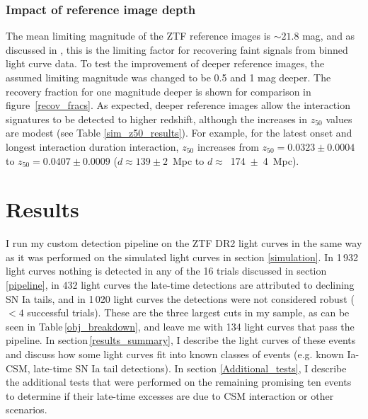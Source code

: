 \documentclass[a4paper,oneside,12pt, class=Latex/Classes/PhDthesisPSnPDF, crop=false]{standalone}
\begin{document}
\subsubsection{Impact of reference image depth}
\label{impact_refdepth}
The mean limiting magnitude of the ZTF reference images is $\sim 21.8$ mag, and as discussed in \citep{ref_uncert}, this is the limiting factor for recovering faint signals from binned light curve data. To test the improvement of deeper reference images, the assumed limiting magnitude was changed to be 0.5 and 1 mag deeper. The recovery fraction for one magnitude deeper is shown for comparison in figure~\ref{recov_fracs}. As expected, deeper reference images allow the interaction signatures to be detected to higher redshift, although the increases in $z_{50}$ values are modest (see Table \ref{sim_z50_results}). For example, for the latest onset and longest interaction duration interaction, $z_{50}$ increases from $z_{50} = 0.0323 \pm 0.0004$ to $z_{50} = 0.0407 \pm 0.0009$ ($d\approx139 \pm 2$~Mpc to $d\approx$~174~$\pm$~4~Mpc).


\section{Results}
\label{DR2_results}
I run my custom detection pipeline on the ZTF DR2 light curves in the same way as it was performed on the simulated light curves in section \ref{simulation}. In 1\,932 light curves nothing is detected in any of the 16 trials discussed in section \ref{pipeline}, in 432 light curves the late-time detections are attributed to declining SN Ia tails, and in 1\,020 light curves the detections were not considered robust ($<4$ successful trials). These are the three largest cuts in my sample, as can be seen in Table\,\ref{obj_breakdown}, and leave me with 134 light curves that pass the pipeline. In section\,\ref{results_summary}, I describe the light curves of these events and discuss how some light curves fit into known classes of events (e.g. known Ia-CSM, late-time SN Ia tail detections). In section \ref{Additional_tests}, I describe the additional tests that were performed on the remaining promising ten events to determine if their late-time excesses are due to CSM interaction or other scenarios.
\end{document}

